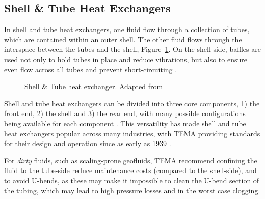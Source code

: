     \subsection{Shell \& Tube Heat Exchangers}
        In shell and tube heat exchangers, one fluid flow through a collection of tubes, which are contained within an outer shell. The other fluid flows through the interspace between the tubes and the shell, Figure~\ref{fig:prosim_litrev_ShellandTubeHX}. On the shell side, baffles are used not only to hold tubes in place and reduce vibrations, but also to ensure even flow across all tubes and prevent short-circuiting \cite{Incropera2007}.

        \begin{figure}[H]
            \centering
            
            \caption[Shell \& Tube heat exchanger.]{Shell \& Tube heat exchanger. Adapted from \cite{Incropera2007}}
            \label{fig:prosim_litrev_ShellandTubeHX}
        \end{figure}

        Shell and tube heat exchangers can be divided into three core components, 1) the front end, 2) the shell and 3) the rear end, with many possible configurations being available for each component \cite{TEMA2019}. This versatility has made shell and tube heat exchangers popular across many industries, with \ac{TEMA} providing standards for their design and operation since as early as 1939 \cite{TEMA2024}. 

        For \emph{dirty} fluids, such as scaling-prone geofluids, \ac{TEMA} recommend confining the fluid to the tube-side reduce maintenance costs (compared to the shell-side), and to avoid U-bends, as these may make it impossible to clean the U-bend section of the tubing, which may lead to high pressure losses and in the worst case clogging.



